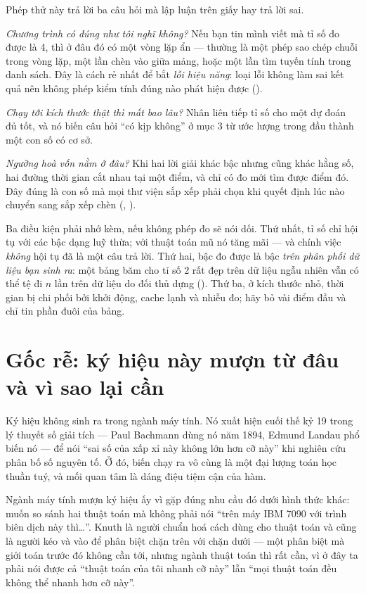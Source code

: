 \documentclass[../../algorithm.tex]{subfiles}
\begin{document}
Phép thử này trả lời ba câu hỏi mà lập luận trên giấy hay trả lời sai.

\emph{Chương trình có đúng như tôi nghĩ không?} Nếu bạn tin mình viết  mà tỉ số đo được là 4, thì ở đâu đó có một vòng lặp ẩn --- thường là một phép sao chép chuỗi trong vòng lặp, một lần chèn vào giữa mảng, hoặc một lần tìm tuyến tính trong danh sách. Đây là cách rẻ nhất để bắt \emph{lỗi hiệu năng}: loại lỗi không làm sai kết quả nên không phép kiểm tính đúng nào phát hiện được ().

\emph{Chạy tới kích thước thật thì mất bao lâu?} Nhân liên tiếp tỉ số cho một dự đoán đủ tốt, và nó biến câu hỏi ``có kịp không'' ở mục 3 từ ước lượng trong đầu thành một con số có cơ sở.

\emph{Ngưỡng hoà vốn nằm ở đâu?} Khi hai lời giải khác bậc nhưng cũng khác hằng số, hai đường thời gian cắt nhau tại một điểm, và chỉ có đo mới tìm được điểm đó. Đây đúng là con số mà mọi thư viện sắp xếp phải chọn khi quyết định lúc nào chuyển sang sắp xếp chèn (, ).

Ba điều kiện phải nhớ kèm, nếu không phép đo sẽ nói dối. Thứ nhất, tỉ số chỉ hội tụ với các bậc dạng luỹ thừa; với thuật toán mũ nó tăng mãi --- và chính việc \emph{không} hội tụ đã là một câu trả lời. Thứ hai, bậc đo được là bậc \emph{trên phân phối dữ liệu bạn sinh ra}: một bảng băm cho tỉ số 2 rất đẹp trên dữ liệu ngẫu nhiên vẫn có thể tệ đi \(n\) lần trên dữ liệu do đối thủ dựng (). Thứ ba, ở kích thước nhỏ, thời gian bị chi phối bởi khởi động, cache lạnh và nhiễu đo; hãy bỏ vài điểm đầu và chỉ tin phần đuôi của bảng.

\section{Gốc rễ: ký hiệu này mượn từ đâu và vì sao lại cần}

Ký hiệu \Ob{\cdot} không sinh ra trong ngành máy tính. Nó xuất hiện cuối thế kỷ 19 trong lý thuyết số giải tích --- Paul Bachmann dùng nó năm 1894, Edmund Landau phổ biến nó --- để nói ``sai số của xấp xỉ này không lớn hơn cỡ này'' khi nghiên cứu phân bố số nguyên tố. Ở đó, biến chạy ra vô cùng là một đại lượng toán học thuần tuý, và mối quan tâm là dáng điệu tiệm cận của hàm.

Ngành máy tính mượn ký hiệu ấy vì gặp đúng nhu cầu đó dưới hình thức khác: muốn so sánh hai thuật toán mà không phải nói ``trên máy IBM 7090 với trình biên dịch này thì\dots''. Knuth là người chuẩn hoá cách dùng cho thuật toán và cũng là người kéo \Om{\cdot} và \Th{\cdot} vào để phân biệt chặn trên với chặn dưới --- một phân biệt mà giới toán trước đó không cần tới, nhưng ngành thuật toán thì rất cần, vì ở đây ta phải nói được cả ``thuật toán của tôi nhanh cỡ này'' lẫn ``mọi thuật toán đều không thể nhanh hơn cỡ này''.
\end{document}
